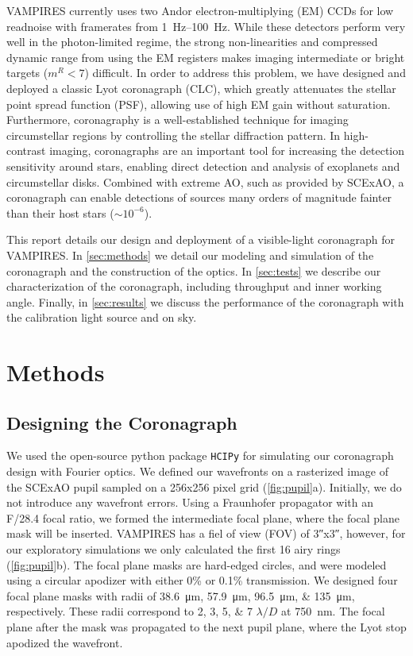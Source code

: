 \documentclass[]{spie}  %
\begin{document}
VAMPIRES currently uses two Andor electron-multiplying (EM) CCDs for low readnoise with framerates from \qtyrange{1}{100}{\hertz}. While these detectors perform very well in the photon-limited regime, the strong non-linearities and compressed dynamic range from using the EM registers makes imaging intermediate or bright targets ($m^R < 7$) difficult. In order to address this problem, we have designed and deployed a classic Lyot coronagraph (CLC), which greatly attenuates the stellar point spread function (PSF), allowing use of high EM gain without saturation. Furthermore, coronagraphy is a well-established technique for imaging circumstellar regions by controlling the stellar diffraction pattern. In high-contrast imaging, coronagraphs are an important tool for increasing the detection sensitivity around stars, enabling direct detection and analysis of exoplanets and circumstellar disks. Combined with extreme AO, such as provided by SCExAO, a coronagraph can enable detections of sources many orders of magnitude fainter than their host stars ($\sim 10^{-6}$)\cite{guyon2018}.

This report details our design and deployment of a visible-light coronagraph for VAMPIRES. In \autoref{sec:methods} we detail our modeling and simulation of the coronagraph and the construction of the optics. In \autoref{sec:tests} we describe our characterization of the coronagraph, including throughput and inner working angle. Finally, in \autoref{sec:results} we discuss the performance of the coronagraph with the calibration light source and on sky.

\section{Methods}\label{sec:methods}

\subsection{Designing the Coronagraph}\label{sec:design}

We used the open-source python package \texttt{HCIPy}\cite{por2018} for simulating our coronagraph design with Fourier optics. We defined our wavefronts on a rasterized image of the SCExAO pupil sampled on a 256x256 pixel grid (\autoref{fig:pupil}a). Initially, we do not introduce any wavefront errors. Using a Fraunhofer propagator with an F/28.4 focal ratio, we formed the intermediate focal plane, where the focal plane mask will be inserted. VAMPIRES has a fiel of view (FOV) of \ang{;;3}x\ang{;;3}, however, for our exploratory simulations we only calculated the first 16 airy rings (\autoref{fig:pupil}b). The focal plane masks are hard-edged circles, and were modeled using a circular apodizer with either 0\% or 0.1\% transmission. We designed four focal plane masks with radii of \qtylist{38.6;57.9;96.5;135}{\micro\meter}, respectively. These radii correspond to \numlist{2;3;5;7} $\lambda/D$ at \qty{750}{\nano\meter}. The focal plane after the mask was propagated to the next pupil plane, where the Lyot stop apodized the wavefront.
\end{document}
